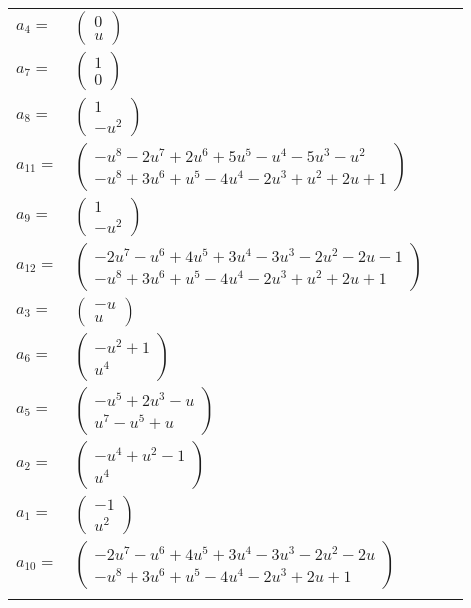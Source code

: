 \documentclass[1p]{elsarticle_modified}
\theoremstyle{definition}
\begin{document}
\begin{tabular}{m{7pt} m{180pt} m{7pt} m{180pt} }
\flushright $a_{4}=$&$\begin{pmatrix}0\\u\end{pmatrix}$ \\
\flushright $a_{7}=$&$\begin{pmatrix}1\\0\end{pmatrix}$ \\
\flushright $a_{8}=$&$\begin{pmatrix}1\\- u^2\end{pmatrix}$ \\
\flushright $a_{11}=$&$\begin{pmatrix}- u^8-2 u^7+2 u^6+5 u^5- u^4-5 u^3- u^2\\- u^8+3 u^6+u^5-4 u^4-2 u^3+u^2+2 u+1\end{pmatrix}$ \\
\flushright $a_{9}=$&$\begin{pmatrix}1\\- u^2\end{pmatrix}$ \\
\flushright $a_{12}=$&$\begin{pmatrix}-2 u^7- u^6+4 u^5+3 u^4-3 u^3-2 u^2-2 u-1\\- u^8+3 u^6+u^5-4 u^4-2 u^3+u^2+2 u+1\end{pmatrix}$ \\
\flushright $a_{3}=$&$\begin{pmatrix}- u\\u\end{pmatrix}$ \\
\flushright $a_{6}=$&$\begin{pmatrix}- u^2+1\\u^4\end{pmatrix}$ \\
\flushright $a_{5}=$&$\begin{pmatrix}- u^5+2 u^3- u\\u^7- u^5+u\end{pmatrix}$ \\
\flushright $a_{2}=$&$\begin{pmatrix}- u^4+u^2-1\\u^4\end{pmatrix}$ \\
\flushright $a_{1}=$&$\begin{pmatrix}-1\\u^2\end{pmatrix}$ \\
\flushright $a_{10}=$&$\begin{pmatrix}-2 u^7- u^6+4 u^5+3 u^4-3 u^3-2 u^2-2 u\\- u^8+3 u^6+u^5-4 u^4-2 u^3+2 u+1\end{pmatrix}$\\&\end{tabular}
\end{document}
